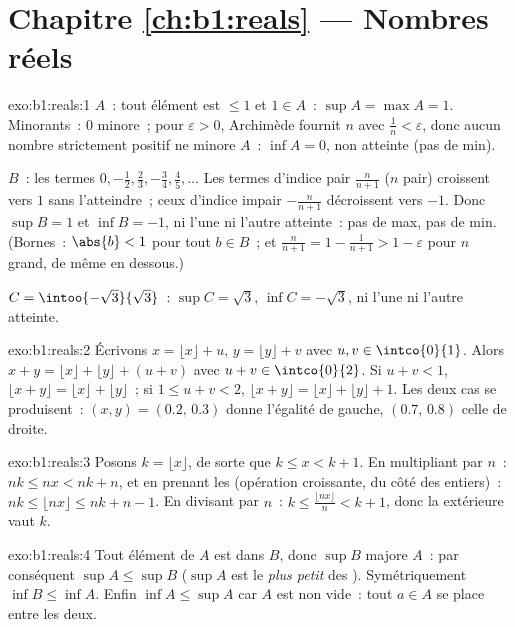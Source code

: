 \section*{Chapitre \ref{ch:b1:reals} --- Nombres réels}

\begin{solution}{exo:b1:reals:1}
$A$~: tout élément est $\leq 1$ et $1 \in A$~: $\sup A = \max A = 1$.
Minorants~: $0$ minore~; pour $\varepsilon > 0$, Archimède fournit
$n$ avec $\frac 1n < \varepsilon$, donc aucun nombre strictement
positif ne minore $A$~: $\inf A = 0$, non atteinte (pas de min).

$B$~: les termes $0, -\frac12, \frac23, -\frac34, \frac45, \dots$ Les
termes d'indice pair $\frac{n}{n+1}$ ($n$ pair) croissent vers $1$
sans l'atteindre~; ceux d'indice impair $-\frac{n}{n+1}$ décroissent
vers $-1$. Donc $\sup B = 1$ et $\inf B = -1$, ni l'une ni l'autre
atteinte~: pas de max, pas de min. (Bornes~: $\abs{b}
< 1$ pour tout $b \in B$~; et $\frac{n}{n+1} = 1 - \frac{1}{n+1} > 1 -
\varepsilon$ pour $n$ grand, de même en dessous.)

$C = \intoo{-\sqrt 3}{\sqrt 3}$~: $\sup C = \sqrt 3$, $\inf C =
-\sqrt 3$, ni l'une ni l'autre atteinte.
\end{solution}

\begin{solution}{exo:b1:reals:2}
Écrivons $x = \lfloor x \rfloor + u$, $y = \lfloor y \rfloor + v$ avec
$u, v \in \intco{0}{1}$. Alors $x + y = \lfloor x \rfloor + \lfloor y
\rfloor + (u + v)$ avec $u + v \in \intco{0}{2}$. Si $u + v < 1$,
$\lfloor x + y\rfloor = \lfloor x\rfloor + \lfloor y \rfloor$~; si
$1 \leq u + v < 2$, $\lfloor x+y \rfloor = \lfloor x \rfloor +
\lfloor y \rfloor + 1$. Les deux cas se produisent~: $(x, y) = (0.2,\,
0.3)$ donne l'égalité de gauche, $(0.7,\, 0.8)$ celle de droite.
\end{solution}

\begin{solution}{exo:b1:reals:3}
Posons $k = \lfloor x \rfloor$, de sorte que $k \leq x < k + 1$. En
multipliant par $n$~: $nk \leq nx < nk + n$, et en prenant les  (opération croissante, du côté des entiers)~: $nk \leq
\lfloor nx \rfloor \leq nk + n - 1$. En divisant par $n$~: $k \leq
\frac{\lfloor nx \rfloor}{n} < k + 1$, donc la 
extérieure vaut $k$.
\end{solution}

\begin{solution}{exo:b1:reals:4}
Tout élément de $A$ est dans $B$, donc $\sup B$ majore $A$~: par
conséquent $\sup A \leq \sup B$ ($\sup A$ est le \emph{plus petit}
des ). Symétriquement $\inf B \leq \inf A$. Enfin $\inf A
\leq \sup A$ car $A$ est non vide~: tout $a \in A$ se place entre les
deux.
\end{solution}

